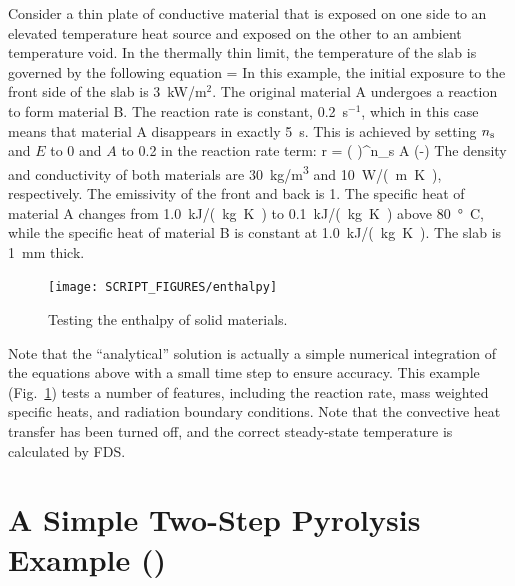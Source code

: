 \documentclass[11pt]{book}
\begin{document}
Consider a thin plate of conductive material that is exposed on one side to an elevated temperature heat source and exposed on the other to an ambient temperature void. In the thermally thin limit, the temperature of the slab is governed by the following equation
\be
    = 
\ee
In this example, the initial exposure to the front side of the slab is 3~kW/m$^2$. The original material A undergoes a reaction to form material B.  The reaction rate is constant, 0.2~s$^{-1}$, which in this case means that material A disappears in exactly 5~s. This is achieved by setting $n_{\rm s}$ and $E$ to 0 and $A$ to 0.2 in the reaction rate term:
\be
    r = \left( \right)^{n_{s}}
    A \; \exp \left(-\right)
\ee
The density and conductivity of both materials are 30~\si{kg/m^3} and 10~\si{W/(m.K)}, respectively. The emissivity of the front and back is 1.  The specific heat of material A changes from 1.0~\si{kJ/(kg.K)} to 0.1~\si{kJ/(kg.K)} above 80~\si{\degree C}, while the specific heat of material B is constant at 1.0~\si{kJ/(kg.K)}. The slab is 1~mm thick.
\begin{figure}[!htb]
\centering
\texttt{[image: SCRIPT\_FIGURES/enthalpy]}
\caption[The  test case]{Testing the enthalpy of solid materials.}
\label{fig:solid_phase_enthalpy}
\end{figure}
Note that the ``analytical'' solution is actually a simple numerical integration of the equations above with a small time step to ensure accuracy.
This example (Fig.~\ref{fig:solid_phase_enthalpy}) tests a number of features, including the reaction rate, mass weighted specific heats, and radiation boundary conditions. Note that the
convective heat transfer has been turned off, and the correct steady-state temperature is calculated by FDS.



\section{A Simple Two-Step Pyrolysis Example (\texorpdfstring{}{two\_step\_solid\_reaction})}
\label{two_step_solid_reaction}
\end{document}
